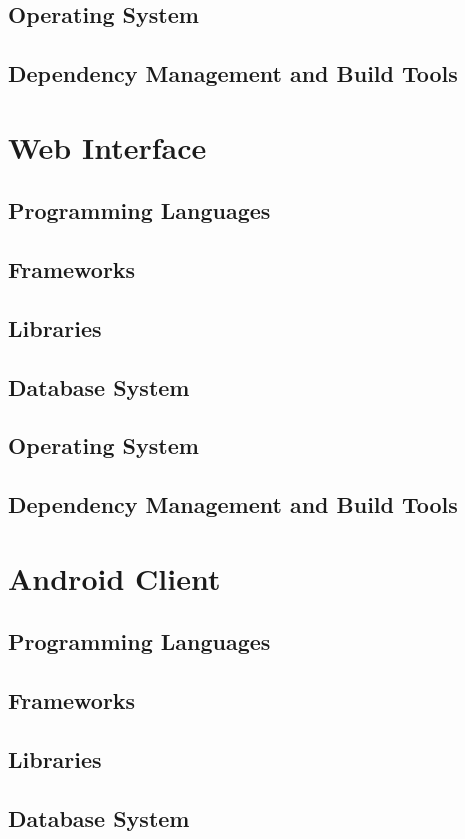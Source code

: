 \documentclass[11pt,fleqn]{book} %
\begin{document}
		\subsection{Operating System}
		\subsection{Dependency Management and Build Tools}
	\section{Web Interface}
		\subsection{Programming Languages}
		\subsection{Frameworks}
		\subsection{Libraries}
		\subsection{Database System}
		\subsection{Operating System}
		\subsection{Dependency Management and Build Tools}
	\section{Android Client}
		\subsection{Programming Languages}
		\subsection{Frameworks}
		\subsection{Libraries}
		\subsection{Database System}
\end{document}
